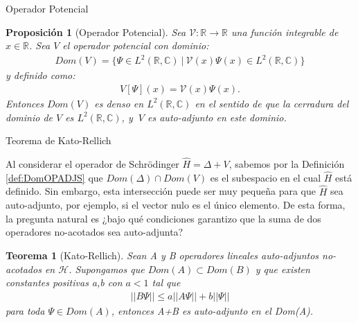 \documentclass[aspectratio=1610]{beamer}
\newcommand*{\field}[1]{\mathbb{#1}}
\newtheorem*{teo}{Teorema}
\newtheorem*{prop}{Proposición}
\begin{document}
\begin{frame}{Operador Potencial}

\begin{prop}[Operador Potencial]
    Sea $\mathcal{V}:\field{R}\rightarrow\field{R}$ una función integrable de $x\in\field{R}$. Sea $V$ el operador potencial con dominio:
    \begin{align*}  Dom(V) = \{
        \Psi\in L^{2}(\field{R},\field{C})\:|\:\mathcal{V}(x)\Psi(x)\in L^{2}(\field{R},\field{C})
        \}
    \end{align*}
    y definido como:
    \begin{align*}
        V[\Psi](x) = \mathcal{V}(x)\Psi(x).
    \end{align*}
    Entonces $Dom(V)$ es denso en $L^{2}(\field{R},\field{C})$ en el sentido de que la cerradura del dominio de $V$ es $L^{2}(\field{R},\field{C})$, y $\:V$ es auto-adjunto en este dominio.
    \label{prop:DomPot}
\end{prop}
    
\end{frame}


\begin{frame}{Teorema de Kato-Rellich}

Al considerar el operador de Schrödinger $\hat{H} = \Delta + V$, sabemos por la Definición \ref{def:DomOPADJS} que $Dom(\Delta)\cap Dom(V)$ es el subespacio en el cual $\hat{H}$ está definido. Sin embargo, esta intersección puede ser muy pequeña para que $\hat{H}$ sea auto-adjunto, por ejemplo, si el vector nulo es el único elemento. De esta forma, la pregunta natural es ¿bajo qué condiciones garantizo que la suma de dos operadores no-acotados sea auto-adjunta?
    
\begin{teo}[Kato-Rellich]
    Sean  A y B operadores lineales auto-adjuntos no-acotados en $\mathcal{H}$. Supongamos que $Dom(A)\subset Dom(B)$ y que existen constantes positivas a,b con $a<1$ tal que
    \begin{align*}
        ||B\Psi|| \leq a||A\Psi|| + b||\Psi||
    \end{align*}
    para toda $\Psi\in Dom(A)$, entonces A+B es auto-adjunto en el Dom(A).
    \label{teo:K-R}
\end{teo}    
\end{frame}
\end{document}
